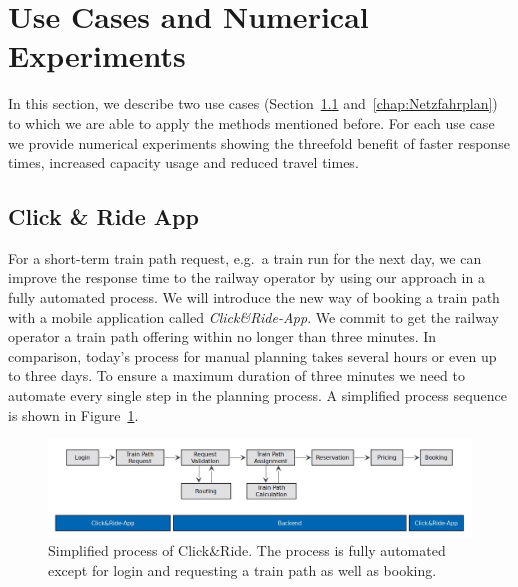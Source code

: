 \section{Use Cases and Numerical Experiments}
\label{chap:useCases}
In this section, we describe two use cases (Section~\ref{chap:CnR} and~\ref{chap:Netzfahrplan}) to which we are able to apply the methods mentioned before. For each use case we provide numerical experiments showing the threefold benefit of faster response times, increased capacity usage and reduced travel times.

\subsection{Click \& Ride App}
\label{chap:CnR}
For a short-term train path request, e.g.\ a train run for the next day, we can improve the response time to the railway operator by using our approach in a fully automated process. We will introduce the new way of booking a train path with a mobile application called \emph{Click\&Ride-App}. We commit to get the railway operator a train path offering within no longer than three minutes. In comparison, today's process for manual planning takes several hours or even up to three days. To ensure a maximum duration of three minutes we need to automate every single step in the planning process. A simplified process sequence is shown in Figure~\ref{fig:process_sequence}. 
%
\begin{figure}[htb]
	\centering
	\includegraphics[width=\textwidth]{Bilder/process_sequence.jpg}
	\caption{Simplified process of Click\&Ride. The process is fully automated except for login and requesting a train path as well as booking.}
	\label{fig:process_sequence}
\end{figure}

